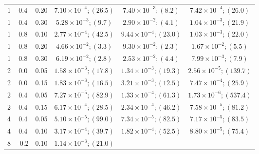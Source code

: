 \begin{table}[t]
{\begin{tabular}{cccccc}
1 & 0.4 & 0.20 & $7.10\times 10^{-4};(26.5)$ & $7.40\times 10^{-3};(8.2)$ & $7.42\times 10^{-4};(26.0)$ \\
1 & 0.4 & 0.30 & $5.28\times 10^{-3};(9.7)$ & $2.90\times 10^{-2};(4.1)$ & $1.04\times 10^{-3};(21.9)$ \\
\midrule
1 & 0.8 & 0.10 & $2.77\times 10^{-4};(42.5)$ & $9.44\times 10^{-4};(23.0)$ & $1.03\times 10^{-3};(22.0)$ \\
1 & 0.8 & 0.20 & $4.66\times 10^{-2};(3.3)$ & $9.30\times 10^{-2};(2.3)$ & $1.67\times 10^{-2};(5.5)$ \\
1 & 0.8 & 0.30 & $6.19\times 10^{-2};(2.8)$ & $2.53\times 10^{-2};(4.4)$ & $7.99\times 10^{-3};(7.9)$ \\
\midrule
2 & 0.0 & 0.05 & $1.58\times 10^{-3};(17.8)$ & $1.34\times 10^{-3};(19.3)$ & $2.56\times 10^{-5};(139.7)$ \\
2 & 0.0 & 0.15 & $1.83\times 10^{-3};(16.5)$ & $3.21\times 10^{-3};(12.5)$ & $7.47\times 10^{-4};(25.9)$ \\
\midrule
2 & 0.4 & 0.05 & $7.27\times 10^{-5};(82.9)$ & $1.33\times 10^{-4};(61.3)$ & $1.73\times 10^{-6};(537.4)$ \\
2 & 0.4 & 0.15 & $6.17\times 10^{-4};(28.5)$ & $2.34\times 10^{-4};(46.2)$ & $7.58\times 10^{-5};(81.2)$ \\
\midrule
4 & 0.4 & 0.05 & $5.10\times 10^{-5};(99.0)$ & $7.34\times 10^{-5};(82.5)$ & $7.17\times 10^{-5};(83.5)$ \\
4 & 0.4 & 0.10 & $3.17\times 10^{-4};(39.7)$ & $1.82\times 10^{-4};(52.5)$ & $8.80\times 10^{-5};(75.4)$ \\
\midrule
8 & -0.2 & 0.10 & $1.14\times 10^{-3};(21.0)$ & \text{--} & \text{--} \\
\bottomrule
\end{tabular}%
}
\end{table}
